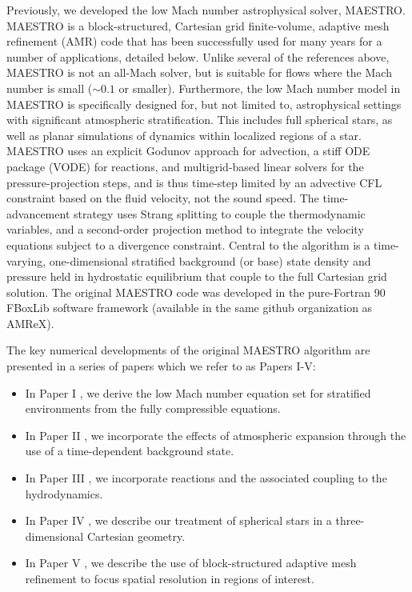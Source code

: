 Previously, we developed the low Mach number astrophysical solver, MAESTRO.
MAESTRO is a block-structured, Cartesian grid finite-volume, adaptive mesh refinement (AMR) code that has been successfully used for many years for a number of applications, detailed below.
Unlike several of the references above, MAESTRO is not an all-Mach solver, but is suitable for flows where the Mach number is small ($\sim 0.1$ or smaller).  
Furthermore, the low Mach number model in MAESTRO is specifically designed for, but not limited to, astrophysical settings with significant atmospheric stratification.
This includes full spherical stars, as well as planar simulations of dynamics within localized regions of a star.
MAESTRO uses an explicit Godunov approach for advection, a stiff ODE package (VODE) \citep{vode} for reactions, and multigrid-based linear solvers for the pressure-projection steps, and is thus time-step limited by an advective CFL constraint based on the fluid velocity, not the sound speed.
The time-advancement strategy uses Strang splitting to couple the thermodynamic variables, and a second-order projection method to integrate the velocity equations subject to a divergence constraint.
Central to the algorithm is a time-varying, one-dimensional stratified background (or base) state density and pressure held in hydrostatic equilibrium that couple to the full Cartesian grid solution.
The original MAESTRO code was developed in the pure-Fortran 90 FBoxLib software framework (available in the same github organization as AMReX).

The key numerical developments of the original MAESTRO algorithm are presented in a series of papers which we refer to as Papers I-V:
\begin{itemize}
\item In Paper I \citep{MAESTRO_I}, we derive the low Mach number equation set for stratified environments from the fully compressible equations.
\item In Paper II \citep{MAESTRO_II}, we incorporate the effects of atmospheric expansion through the use of a time-dependent background state.
\item In Paper III \citep{MAESTRO_III}, we incorporate reactions and the associated coupling to the hydrodynamics.
\item In Paper IV \citep{MAESTRO_IV}, we describe our treatment of spherical stars in a three-dimensional Cartesian geometry.
\item In Paper V \citep{MAESTRO_V}, we describe the use of block-structured adaptive mesh refinement to focus spatial resolution in regions of interest.
\end{itemize}

